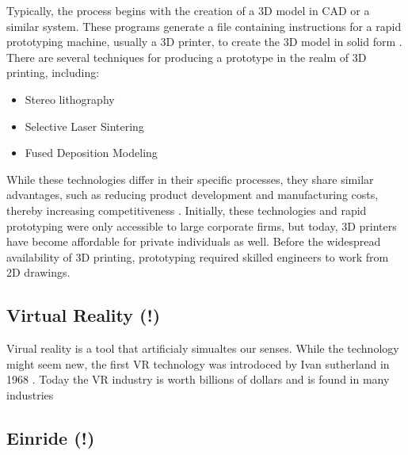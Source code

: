 Typically, the process begins with the creation of a 3D model in CAD or a similar system. 
These programs generate a file containing instructions for a rapid prototyping machine, usually 
a 3D printer, to create the 3D model in solid form \cite{sriharsha2018rapid}. There are several 
techniques for producing a prototype in the realm of 3D printing, including:
\begin{itemize}
    \item Stereo lithography
    \item Selective Laser Sintering
    \item Fused Deposition Modeling
\end{itemize}
While these technologies differ in their specific processes, they share similar advantages, such as 
reducing product development and manufacturing costs, thereby increasing competitiveness 
\cite{PHAM19981257}. Initially, these technologies and rapid prototyping were only accessible to 
large corporate firms, but today, 3D printers have become affordable for private individuals as well. 
Before the widespread availability of 3D printing, prototyping required skilled engineers to work from 
2D drawings.


\subsection{Virtual Reality (!)}
Virual reality  is a tool that artificialy simualtes our senses. While the technology might seem new, 
the first VR technology was introdoced by Ivan sutherland in 1968 \cite{lavalle2023virtual}. Today the VR
industry is worth billions of dollars and is found in many industries
\subsection{Einride (!)}